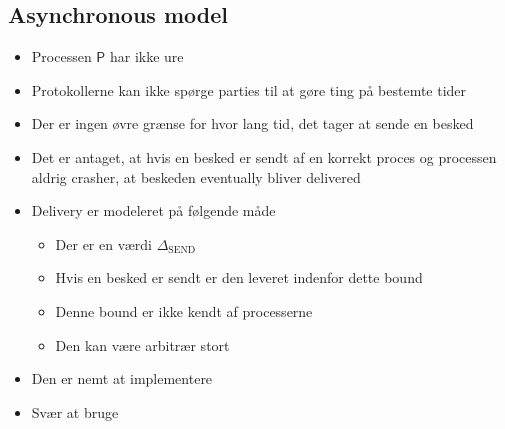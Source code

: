 \documentclass[a4, english]{article}
\begin{document}
\subsection{Asynchronous model}
\begin{itemize}
	\item Processen $\mathsf P$ har ikke ure 
  \item Protokollerne kan ikke spørge parties til at gøre ting på bestemte tider 
  \item Der er ingen øvre grænse for hvor lang tid, det tager at sende en besked 
  \item Det er antaget, at hvis en besked er sendt af en korrekt proces og processen aldrig crasher, at beskeden eventually bliver delivered 
  \item Delivery er modeleret på følgende måde    
  \begin{itemize}
  	\item Der er en værdi $\Delta_\text{SEND}$
    \item Hvis en besked er sendt er den leveret indenfor dette bound 
    \item Denne bound er ikke kendt af processerne
    \item Den kan være arbitrær stort
  \end{itemize}
  \item Den er nemt at implementere
  \item Svær at bruge
\end{itemize}
\end{document}
